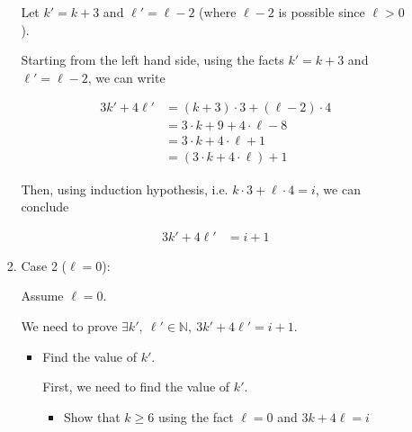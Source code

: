 \documentclass[12pt]{article}
\begin{document}
\begin{itemize}
\begin{mdframed}
\begin{enumerate}[1.]
\begin{enumerate}[1.]
\begin{mdframed}
                Let $k' = k + 3$ and $\ell' = \ell - 2$ (where $\ell - 2$ is possible
                since $\ell > 0$).

                \bigskip

                Starting from the left hand side, using the facts $k' = k + 3$ and $\ell' = \ell - 2$, we can write

                \setcounter{equation}{0}
                \begin{align}
                    3k' + 4\ell' &= (k+3) \cdot 3 + (\ell-2) \cdot 4\\
                    &= 3 \cdot k + 9 + 4 \cdot \ell - 8\\
                    &= 3 \cdot k + 4 \cdot \ell + 1\\
                    &= (3 \cdot k + 4 \cdot \ell) + 1
                \end{align}

                \bigskip

                Then, using induction hypothesis, i.e. $k \cdot 3 + \ell \cdot 4 = i$, we can conclude

                \begin{align}
                    3k' + 4\ell' &= i + 1
                \end{align}
                \end{mdframed}

                \item Case 2 ($\ell = 0$):

                \bigskip

                Assume $\ell = 0$.

                \bigskip

                We need to prove $\exists k',\:\ell' \in \mathbb{N},\:3k' + 4\ell' = i + 1$.

                \bigskip

                \begin{itemize}
                    \item Find the value of $k'$.

                    \bigskip

                    First, we need to find the value of $k'$.

                    \bigskip

                    \begin{itemize}
                        \item Show that $k \geq 6$ using the fact $\ell = 0$ and $3k + 4\ell = i$


\end{itemize}
\end{itemize}
\end{enumerate}
\end{enumerate}
\end{mdframed}
\end{itemize}
\end{document}
